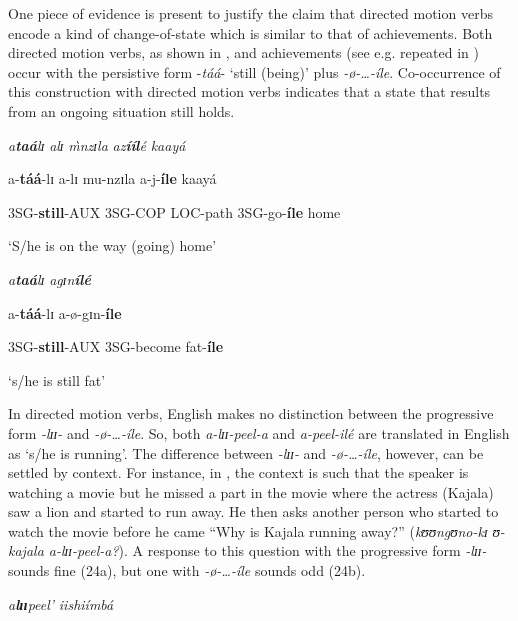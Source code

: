 \documentclass[output=paper,newtxmath,modfonts,nonflat,draftmode]{langsci/langscibook}
\begin{document}
One piece of evidence is present to justify the claim that directed motion verbs encode a kind of change-of-state which is similar to that of achievements. Both directed motion verbs, as shown in , and achievements (see e.g.  repeated in ) occur with the persistive form -\textit{táá}- ‘still (being)’ plus \textit{-ø}\textit{-…-íle}. Co-occurrence of this construction with directed motion verbs indicates that a state that results from an ongoing situation still holds.

\ea \label{ex:kanijo:22}
\textit{a}\textbf{\textit{taá}}\textit{lɪ}             \textit{alɪ}            \textit{\`{m}nz}\textit{ɪla}      \textit{az}\textbf{\textit{ííl}}\textit{é}         \textit{kaayá}

  a-\textbf{táá}-lɪ           a-lɪ           mu-nzɪla  a-j-\textbf{íle}        kaayá

  3SG-\textbf{still}-AUX 3SG-COP LOC-path 3SG-go-\textbf{íle} home

  ‘S/he is on the way (going) home’
\z

\ea \label{ex:kanijo:23}
\textit{a}\textbf{\textit{taá}}\textit{lɪ}              \textit{agɪ}\textit{n}\textbf{\textit{ílé}} 
 

  a-\textbf{táá}-lɪ            a-ø-gɪn-\textbf{íle}

  3SG-\textbf{still}-AUX 3SG-become fat-\textbf{íle}

  ‘s/he is still fat’
\z


In directed motion verbs, English makes no distinction between the progressive form \textit{-lɪɪ}\textit{-} and \textit{-ø}\textit{-…-íle}. So, both \textit{a-lɪɪ}\textit{-peel-a} and \textit{a-peel-ilé} are translated in English as ‘s/he is running’. The difference between \textit{-lɪɪ}\textit{-} and \textit{-ø}\textit{-…-íle}, however, can be settled by context. For instance, in , the context is such that the speaker is watching a movie but he missed a part in the movie where the actress (Kajala) saw a lion and started to run away. He then asks another person who started to watch the movie before he came “Why is Kajala running away?” (\textit{kʊʊ}\textit{ngʊ}\textit{no-kɪ} \textit{ʊ}\textit{-kajala a-l}\textit{ɪɪ-peel-a?}). A response to this question with the progressive form \textit{-lɪɪ}\textit{-} sounds fine (24a), but one with \textit{-ø}\textit{-…-íle} sounds odd (24b). 

\ea \label{ex:kanijo:24}
\ea \textit{a}\textbf{\textit{l}}\textbf{\textit{ɪɪ}}\textit{peel’}                  \textit{iishiímbá}
\end{document}
